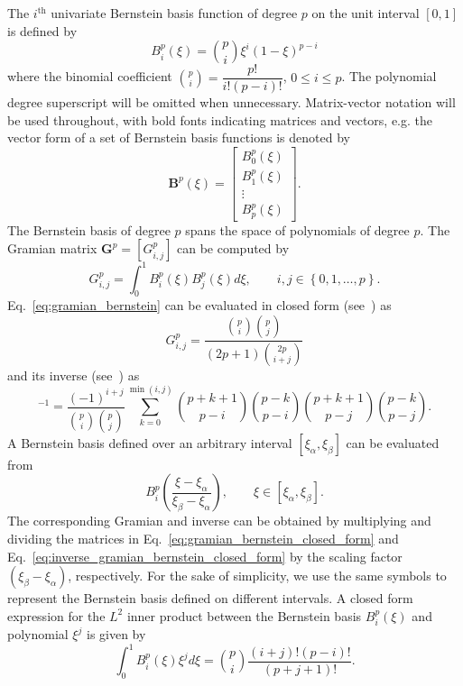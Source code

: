 The $i^{\text{th}}$ univariate Bernstein basis function of degree $p$ on the unit interval $\left[ 0,1 \right]$ is defined by
\begin{equation}
    B_i^p(\xi) = \binom {p}{i}\xi^i(1-\xi)^{p-i}
\end{equation}
where the binomial coefficient $\binom {p}{i}=\dfrac{p!}{i!(p-i)!}$, $0\leq{i}\leq{p}$. The polynomial degree superscript will be omitted when unnecessary. Matrix-vector notation will be used throughout, with bold fonts indicating matrices and vectors, e.g. the vector form of a set of Bernstein basis functions is denoted by
\begin{equation}
    \mathbf{B}^p(\xi)=
    \begin{bmatrix}
        B_0^p(\xi) \\
        B_1^p(\xi) \\
        \vdots     \\
        B_p^p(\xi)
    \end{bmatrix}.
\end{equation}
The Bernstein basis of degree $p$ spans the space of polynomials of degree $p$. The Gramian matrix $\mathbf{G}^p = [G_{i,j}^p]$ can be computed by
\begin{equation}
    G_{i,j}^p=\int_0^1B_i^p(\xi) B_j^p(\xi)d\xi,\qquad{i,j\in\left\{0,1,\dots, p\right\}}.\label{eq:gramian_bernstein}
\end{equation}
Eq.~\eqref{eq:gramian_bernstein} can be evaluated in closed form (see~\cite{farouki1988algorithms}) as
\begin{equation}
    G_{i,j}^p = \frac{\binom {p}{i}\binom {p}{j}}{(2p+1)\binom {2p}{i+j}}\label{eq:gramian_bernstein_closed_form}
\end{equation}
and its inverse (see~\cite{juttler1998dual}) as
\begin{equation}
    [G_{i,j}^p]^{-1} = \frac{(-1)^{i+j}}{\binom {p}{i}\binom {p}{j}}\sum_{k=0}^{\min(i,j)}\binom{p+k+1}{p-i}\binom{p-k}{p-i}\binom{p+k+1}{p-j}\binom{p-k}{p-j}.\label{eq:inverse_gramian_bernstein_closed_form}
\end{equation}
A Bernstein basis defined over an arbitrary interval $\left[\xi_\alpha,\xi_\beta\right]$ can be evaluated from
\begin{equation}
    B_i^p(\frac{\xi-\xi_\alpha}{\xi_\beta-\xi_\alpha}),\qquad \xi\in\left[\xi_\alpha,\xi_\beta\right].
\end{equation}
The corresponding Gramian and inverse can be obtained by multiplying and dividing the matrices in Eq.~\eqref{eq:gramian_bernstein_closed_form} and Eq.~\eqref{eq:inverse_gramian_bernstein_closed_form} by the scaling factor $(\xi_\beta-\xi_\alpha)$, respectively. For the sake of simplicity, we use the same symbols to represent the Bernstein basis defined on different intervals. A closed form expression for the $L^2$ inner product between the Bernstein basis $B_i^p(\xi)$ and polynomial $\xi^j$ is given by
\begin{equation}
    \int_0^1 B_i^p (\xi) \xi^j d\xi = \binom{p}{i} \frac{(i+j)! (p-i)!}{(p+j+1)!}.\label{eq:inner_product_bernstein_polynomial}
\end{equation}

